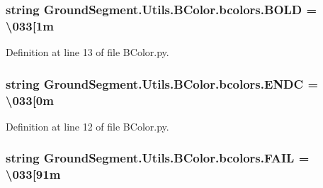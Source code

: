 \subsubsection[{B\+O\+L\+D}]{\setlength{\rightskip}{0pt plus 5cm}string Ground\+Segment.\+Utils.\+B\+Color.\+bcolors.\+B\+O\+L\+D = \textquotesingle{}\textbackslash{}033\mbox{[}1m\textquotesingle{}\hspace{0.3cm}{\ttfamily [static]}}\label{class_ground_segment_1_1_utils_1_1_b_color_1_1bcolors_ab8132c269e197df88cdac8f1f8de82e1}


Definition at line 13 of file B\+Color.\+py.

\hypertarget{class_ground_segment_1_1_utils_1_1_b_color_1_1bcolors_ae845b723ae62e3efb7f7a047a88d2bd7}{}
\subsubsection[{E\+N\+D\+C}]{\setlength{\rightskip}{0pt plus 5cm}string Ground\+Segment.\+Utils.\+B\+Color.\+bcolors.\+E\+N\+D\+C = \textquotesingle{}\textbackslash{}033\mbox{[}0m\textquotesingle{}\hspace{0.3cm}{\ttfamily [static]}}\label{class_ground_segment_1_1_utils_1_1_b_color_1_1bcolors_ae845b723ae62e3efb7f7a047a88d2bd7}


Definition at line 12 of file B\+Color.\+py.

\hypertarget{class_ground_segment_1_1_utils_1_1_b_color_1_1bcolors_a9cec8523e8ad132eaf3c4a6a71352bf4}{}
\subsubsection[{F\+A\+I\+L}]{\setlength{\rightskip}{0pt plus 5cm}string Ground\+Segment.\+Utils.\+B\+Color.\+bcolors.\+F\+A\+I\+L = \textquotesingle{}\textbackslash{}033\mbox{[}91m\textquotesingle{}\hspace{0.3cm}{\ttfamily [static]}}\label{class_ground_segment_1_1_utils_1_1_b_color_1_1bcolors_a9cec8523e8ad132eaf3c4a6a71352bf4}


